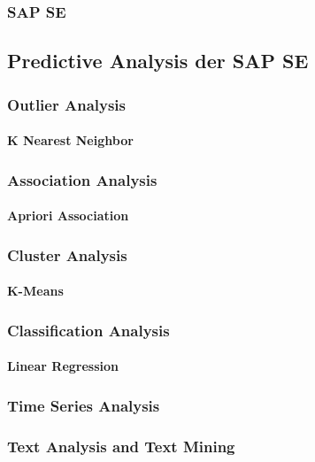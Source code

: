 \subsubsection{SAP SE}

\subsection{Predictive Analysis der SAP SE}

\subsubsection{Outlier Analysis}

\paragraph{K Nearest Neighbor}

\subsubsection{Association Analysis}

\paragraph{Apriori Association}

\subsubsection{Cluster Analysis}

\paragraph{K-Means}

\subsubsection{Classification Analysis}

\paragraph{Linear Regression}

\subsubsection{Time Series Analysis}

\subsubsection{Text Analysis and Text Mining}

\newpage